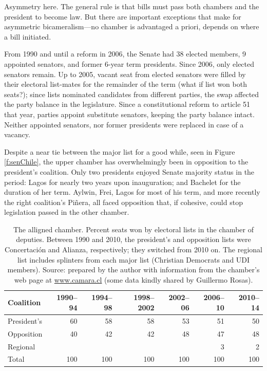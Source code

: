 \documentclass[letter,12pt]{article}
\begin{document}
Asymmetry here. The general rule is that bills must pass both chambers and the president to become law. But there are important exceptions that make for asymmetric bicameralism---no chamber is advantaged a priori, depends on where a bill initiated. 

From 1990 and until a reform in 2006, the Senate had 38 elected members, 9 appointed senators, and former 6-year term presidents. Since 2006, only elected senators remain. Up to 2005, vacant seat from elected senators were filled by their electoral list-mates for the remainder of the term (what if list won both seats?); since lists nominated candidates from different parties, the swap affected the party balance in the legislature. Since a constitutional reform to article 51 that year, parties appoint substitute senators, keeping the party balance intact. Neither appointed senators, nor former presidents were replaced in case of a vacancy. 

Despite a near tie between the major list for a good while, seen in Figure \ref{f:senChile}, the upper chamber has overwhelmingly been in opposition to the president's coalition. Only two presidents enjoyed Senate majority status in the period: Lagos for nearly two years upon inauguration; and Bachelet for the duration of her term. Aylwin, Frei, Lagos for most of his term, and more recently the right coalition's Piñera, all faced opposition that, if cohesive, could stop legislation passed in the other chamber.  


\begin{table}
\begin{center}
\begin{tabular}{lrrrrrr}
Coalition & 1990--94 & 1994--98 & 1998--2002 & 2002--06 & 2006--10 & 2010--14 \\ \hline
President's & 60 & 58 & 58 & 53 & 51 & 50  \\
Opposition & 40 & 42 & 42 & 48 & 47 & 48  \\
Regional &  &  &  &  & 3 & 2  \\ \hline
Total & 100 & 100 & 100 & 100 & 100 & 100  \\
\end{tabular}
\caption{The alligned chamber. Percent seats won by electoral lists in the chamber of deputies. Between 1990 and 2010, the president's and opposition lists were Concertación and Alianza, respectively; they switched from 2010 on. The regional list includes splinters from each major list (Christian Democrats and UDI members). Source: prepared by the author with information from the chamber's web page at \protect\url{www.camara.cl} (some data kindly shared by Guillermo Rosas).}\label{t:camDip}
\end{center}
\end{table}
\end{document}
